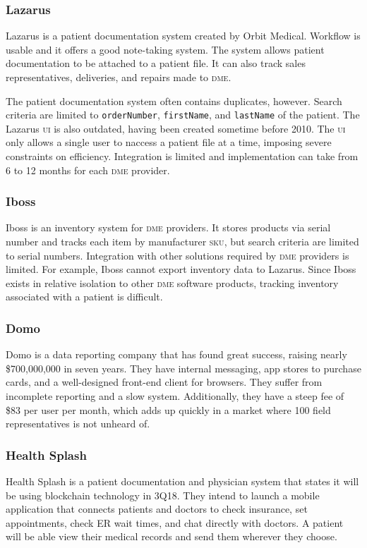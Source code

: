   \subsubsection{Lazarus}
  Lazarus is a patient documentation system created by Orbit Medical. Workflow is usable and it offers a good note-taking system. The system allows patient documentation to be attached to a patient file. It can also track sales representatives, deliveries, and repairs made to \textsc{dme}.%

  The patient documentation system often contains duplicates, however. Search criteria are limited to \texttt{orderNumber}, \texttt{firstName}, and \texttt{lastName} of the patient. The Lazarus \textsc{ui} is also outdated, having been created sometime before 2010. The \textsc{ui} only allows a single user to naccess a patient file at a time, imposing severe constraints on efficiency. Integration is limited and implementation can take from 6 to 12 months for each \textsc{dme} provider.%

  \subsubsection{Iboss}
  Iboss is an inventory system for \textsc{dme} providers. It stores products via serial number and tracks each item by manufacturer \textsc{sku}, but search criteria are limited to serial numbers. Integration with other solutions required by \textsc{dme} providers is limited. For example, Iboss cannot export inventory data to Lazarus. Since Iboss exists in relative isolation to other \textsc{dme} software products, tracking inventory associated with a patient is difficult.%

  \subsubsection{Domo}
  Domo is a data reporting company that has found great success, raising nearly \$700,000,000 in seven years. They have internal messaging, app stores to purchase cards, and a well-designed front-end client for browsers. They suffer from incomplete reporting and a slow system. Additionally, they have a steep fee of \$83 per user per month, which adds up quickly in a market where 100 field representatives is not unheard of.%

  \subsubsection{Health Splash}
  Health Splash is a patient documentation and physician system that states it will be using blockchain technology in 3Q18. They intend to launch a mobile application that connects patients and doctors to check insurance, set appointments, check ER wait times, and chat directly with doctors. A patient will be able view their medical records and send them wherever they choose.%

